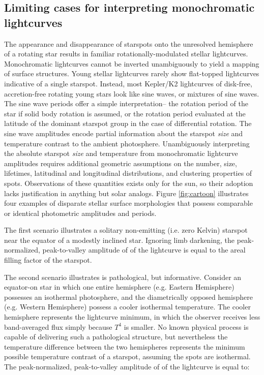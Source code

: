 \documentclass[twocolumn]{emulateapj}%
\begin{document}
\subsection{Limiting cases for interpreting monochromatic lightcurves}
The appearance and disappearance of starspots onto the unresolved hemisphere of a rotating star results in familiar rotationally-modulated stellar lightcurves.  Monochromatic lightcurves cannot be inverted unambiguously to yield a mapping of surface structures.  Young stellar lightcurves rarely show flat-topped lightcurves indicative of a single starspot.  Instead, most Kepler/K2 lightcurves of disk-free, accretion-free rotating young stars look like sine waves, or mixtures of sine waves.  The sine wave periods offer a simple interpretation-- the rotation period of the star if solid body rotation is assumed, or the rotation period evaluated at the latitude of the dominant starspot group in the case of differential rotation.  The sine wave amplitudes encode partial information about the starspot \emph{size} and temperature contrast to the ambient photosphere.  Unambiguously interpreting the absolute starspot \emph{size} and temperature from monochromatic lightcurve amplitudes requires additional geometric assumptions on the number, size, lifetimes, latitudinal and longitudinal distributions, and clustering properties of spots.  Observations of these quantities exists only for the sun, so their adoption lacks justification in anything but solar analogs.  Figure \ref{fig:cartoon} illustrates four examples of disparate stellar surface morphologies that possess comparable or identical photometric amplitudes and periods.

The first scenario illustrates a solitary non-emitting (i.e. zero Kelvin) starspot near the equator of a modestly inclined star.  Ignoring limb darkening, the peak-normalized, peak-to-valley amplitude of of the lightcurve is equal to the areal filling factor of the starspot.

The second scenario illustrates is pathological, but informative.  Consider an equator-on star in which one entire hemisphere (e.g. Eastern Hemisphere) possesses an isothermal photosphere, and the diametrically opposed hemisphere (e.g. Western Hemisphere) possess a cooler isothermal temperature.  The cooler hemisphere represents the lightcurve minimum, in which the observer receives less band-averaged flux simply because $T^4$ is smaller.  No known physical process is capable of delivering such a pathological structure, but nevertheless the temperature difference between the two hemispheres represents the minimum possible temperature contrast of a starspot, assuming the spots are isothermal.  The peak-normalized, peak-to-valley amplitude of of the lightcurve is equal to:
\end{document}
